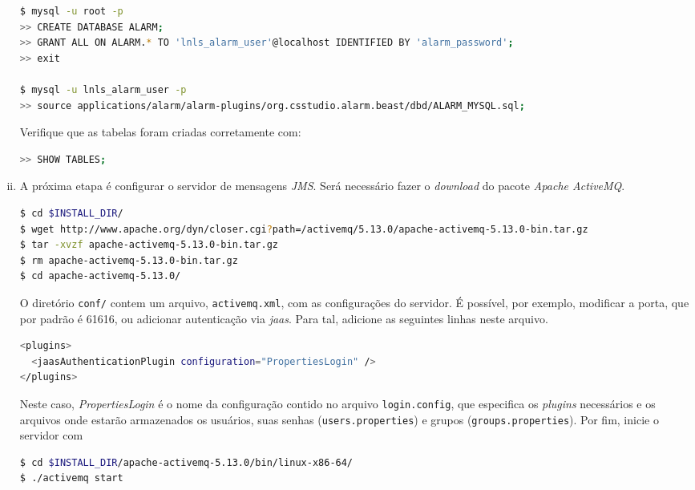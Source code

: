 \begin{enumerate}[i.]
\begin{lstlisting}[language=bash, style=nonumbers]
$ mysql -u root -p
>> CREATE DATABASE ALARM;
>> GRANT ALL ON ALARM.* TO 'lnls_alarm_user'@localhost IDENTIFIED BY 'alarm_password';
>> exit

$ mysql -u lnls_alarm_user -p
>> source applications/alarm/alarm-plugins/org.csstudio.alarm.beast/dbd/ALARM_MYSQL.sql;
\end{lstlisting}

Verifique que as tabelas foram criadas corretamente com:

\begin{lstlisting}[language=bash, style=nonumbers]
>> SHOW TABLES;
\end{lstlisting}
   
\item A próxima etapa é configurar o servidor de mensagens \textit{JMS}. Será
necessário fazer o \textit{download} do pacote \textit{Apache ActiveMQ}.

\begin{lstlisting}[language=bash, style=nonumbers]
$ cd $INSTALL_DIR/
$ wget http://www.apache.org/dyn/closer.cgi?path=/activemq/5.13.0/apache-activemq-5.13.0-bin.tar.gz
$ tar -xvzf apache-activemq-5.13.0-bin.tar.gz
$ rm apache-activemq-5.13.0-bin.tar.gz
$ cd apache-activemq-5.13.0/
\end{lstlisting}

O diretório \texttt{conf/} contem um arquivo, \texttt{activemq.xml}, com as
configurações do servidor. É possível, por exemplo, modificar a porta, que por
padrão é 61616, ou adicionar autenticação via \textit{jaas}. Para tal, adicione
as seguintes linhas neste arquivo.

\begin{lstlisting}[language=bash, style=nonumbers]
<plugins>
  <jaasAuthenticationPlugin configuration="PropertiesLogin" />
</plugins>
\end{lstlisting}

Neste caso, \textit{PropertiesLogin} é o nome da configuração contido no arquivo
\texttt{login.config}, que especifica os \textit{plugins} necessários e os
arquivos onde estarão armazenados os usuários, suas senhas (\texttt{users.properties}) e grupos
(\texttt{groups.properties}). Por fim, inicie o servidor com 

\begin{lstlisting}[language=bash, style=nonumbers]
$ cd $INSTALL_DIR/apache-activemq-5.13.0/bin/linux-x86-64/
$ ./activemq start
\end{lstlisting}


\end{enumerate}
